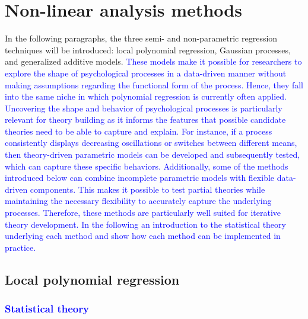\documentclass[man, floatsintext]{apa7}
\begin{document}
\section{Non-linear analysis methods}\label{method_introduction}

In the following paragraphs, the three semi- and non-parametric regression
techniques will be introduced: local polynomial regression, Gaussian processes,
and generalized additive models. \textcolor{blue}{ These models make it
  possible for researchers to explore the shape of psychological processes in a
  data-driven manner without making assumptions regarding the functional form
  of
  the process. Hence, they fall into the same niche in which polynomial
  regression is currently often applied. Uncovering the shape and behavior of
  psychological processes is particularly relevant for theory building as it
  informs the features that possible candidate theories need to be able to
  capture and explain. For instance, if a process consistently displays
  decreasing oscillations or switches between different means, then
  theory-driven
  parametric models can be developed and subsequently tested, which can capture
  these specific behaviors. Additionally, some of the methods introduced below
  can combine incomplete parametric models with flexible data-driven
  components. This makes it possible to test partial theories while maintaining
  the necessary flexibility to accurately capture the underlying processes.
  Therefore, these methods are particularly well suited for iterative theory
  development. In the following an introduction to the statistical theory
  underlying each method and show how each method can be implemented in
  practice.}

\subsection{Local polynomial regression}

\subsubsection{\textcolor{blue}{Statistical theory}}
\end{document}
